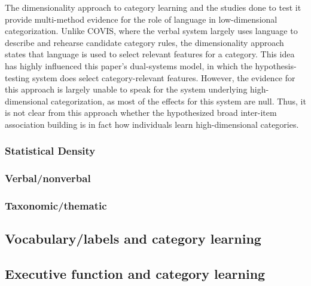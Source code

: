 \documentclass[../dissertation.tex]{subfiles}
\begin{document}
	The dimensionality approach to category learning and the studies done to test it provide multi-method evidence for the role of language in low-dimensional categorization. Unlike COVIS, where the verbal system largely uses language to describe and rehearse candidate category rules, the dimensionality approach states that language is used to select relevant features for a category. This idea has highly influenced this paper's dual-systems model, in which the hypothesis-testing system does select category-relevant features. However, the evidence for this approach is largely unable to speak for the system underlying high-dimensional categorization, as most of the effects for this system are null. Thus, it is not clear from this approach whether the hypothesized broad inter-item association building is in fact how individuals learn high-dimensional categories.
\subsubsection{Statistical Density}
\subsubsection{Verbal/nonverbal}
\subsubsection{Taxonomic/thematic}

 
\subsection{Vocabulary/labels and category learning}

\subsection{Executive function and category learning}
\end{document}
